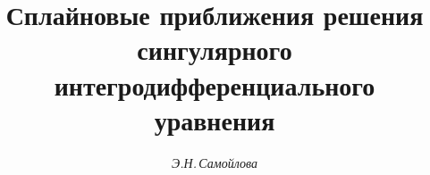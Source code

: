 




%





\newcommand{\const}{\operatorname{const}}


\newcommand{\Lip}{\operatorname{Lip}}


\newcommand{\tts}[1]{}









\setcounter{page}{35}















\author{\it Э.Н.\,Самойлова }




\title{Сплайновые приближения решения сингулярного \\


интегродифференциального уравнения}





\date{}




\pagestyle{plain} %







\maketitle


